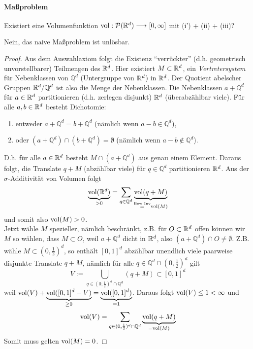 \paragraph{Maßproblem} Existiert eine Volumenfunktion $\operatorname{vol}: \mathcal{P}(\mathbb{R}^d) \longrightarrow [0,\infty]$ mit (i') + (ii) + (iii)?
\begin{satz}[Vitali, 1905] Nein, das naive Maßproblem ist unlösbar.
\begin{proof}
Aus dem Auswahlaxiom folgt die Existenz ``verrückter'' (d.h. geometrisch unvorstellbarer) Teilmengen des $\mathbb{R}^d$. Hier existiert $M \subset \mathbb{R}^d$, ein \emph{Vertretersystem} für Nebenklassen von $\mathbb{Q}^d$ (Untergruppe von $\mathbb{R}^d$) in $\mathbb{R}^d$. Der Quotient abelscher Gruppen $\mathbb{R}^d/\mathbb{Q}^d$ ist also die Menge der Nebenklassen. Die Nebenklassen $a+\mathbb{Q}^d$ für $a\in \mathbb{R}^d$ partitionieren (d.h. zerlegen disjunkt) $\mathbb{R}^d$ (überabzählbar viele). Für alle $a,b \in \mathbb{R}^d$ besteht Dichotomie:
\begin{enumerate}[label=\roman*),topsep=3pt, itemsep=0pt]
\item entweder $a+\mathbb{Q}^d = b + \mathbb{Q}^d$ (nämlich wenn $a-b \in \mathbb{Q}^d$),
\item oder $(a+\mathbb{Q}^d)\cap (b+\mathbb{Q}^d) = \emptyset$ (nämlich wenn $a-b \notin \mathbb{Q}^d$).
\end{enumerate}
D.h. für alle $a\in \mathbb{R}^d$ besteht $M \cap (a+\mathbb{Q}^d)$ aus genau einem Element. Daraus folgt, die Translate $q+M$ (abzählbar viele) für $q \in \mathbb{Q}^d$ partitionieren $\mathbb{R}^d$. Aus der $\sigma$-Additivität von Volumen folgt
\begin{equation}
\underbrace{\operatorname{vol} (\mathbb{R}^d)}_{>0}= \sum_{q \in \mathbb{Q}^d} \underbrace{\operatorname{vol} (q+M)}_{\overset{\text{Bew Inv}}{=} \operatorname{vol}(M)}
\end{equation} 
und somit also $\operatorname{vol} (M)>0$.\\
Jetzt wähle $M$ spezieller, nämlich beschränkt, z.B. für $O\subset \mathbb{R}^d$ offen können wir $M$ so wählen, dass $M\subset O$, weil $a+\mathbb{Q}^d$ dicht in $\mathbb{R}^d$, also $(a+\mathbb{Q}^d)\cap O \neq \emptyset$. Z.B. wähle $M \subset (0,\frac{1}{2})^d$, so enthält $[0,1]^d$ abzählbar unendlich viele paarweise disjunkte Translate $q+M$, nämlich für alle $q\in \mathbb{Q}^d \cap (0,\frac{1}{2})^d$ gilt
\begin{equation}
V:= \bigcup_{q\in(0,\frac{1}{2})^d \cap \mathbb{Q}^d} (q+M) \subset [0,1]^d
\end{equation}
weil $\operatorname{vol} (V) + \underbrace{\operatorname{vol} ([0,1]^d-V)}_{\geq 0} = \underbrace{\operatorname{vol} ([0,1]^d)}_{=1}$. Daraus folgt $\operatorname{vol} (V) \leq 1 < \infty$ und 
\begin{equation}
\operatorname{vol}(V) = \sum_{q\in(0,\frac{1}{2})^d \cap \mathbb{Q}^d} \underbrace{\operatorname{vol} (q+M)}_{=\operatorname{vol}(M)}
\end{equation}
Somit muss gelten $\operatorname{vol}(M)=0$. \Lightning
\end{proof}
\end{satz}
